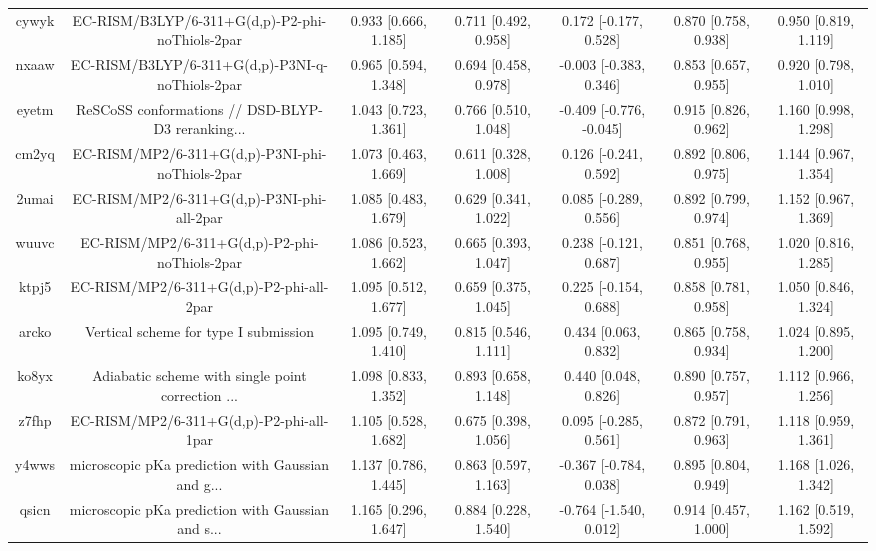 \documentclass{article}
\begin{document}
\begin{center}
\begin{longtable}{|ccccccc|}
 cywyk &    EC-RISM/B3LYP/6-311+G(d,p)-P2-phi-noThiols-2par &  0.933 [0.666, 1.185] &  0.711 [0.492, 0.958] &    0.172 [-0.177, 0.528] &  0.870 [0.758, 0.938] &   0.950 [0.819, 1.119] \\
 nxaaw &    EC-RISM/B3LYP/6-311+G(d,p)-P3NI-q-noThiols-2par &  0.965 [0.594, 1.348] &  0.694 [0.458, 0.978] &   -0.003 [-0.383, 0.346] &  0.853 [0.657, 0.955] &   0.920 [0.798, 1.010] \\
 eyetm &  ReSCoSS conformations // DSD-BLYP-D3 reranking... &  1.043 [0.723, 1.361] &  0.766 [0.510, 1.048] &  -0.409 [-0.776, -0.045] &  0.915 [0.826, 0.962] &   1.160 [0.998, 1.298] \\
 cm2yq &    EC-RISM/MP2/6-311+G(d,p)-P3NI-phi-noThiols-2par &  1.073 [0.463, 1.669] &  0.611 [0.328, 1.008] &    0.126 [-0.241, 0.592] &  0.892 [0.806, 0.975] &   1.144 [0.967, 1.354] \\
 2umai &         EC-RISM/MP2/6-311+G(d,p)-P3NI-phi-all-2par &  1.085 [0.483, 1.679] &  0.629 [0.341, 1.022] &    0.085 [-0.289, 0.556] &  0.892 [0.799, 0.974] &   1.152 [0.967, 1.369] \\
 wuuvc &      EC-RISM/MP2/6-311+G(d,p)-P2-phi-noThiols-2par &  1.086 [0.523, 1.662] &  0.665 [0.393, 1.047] &    0.238 [-0.121, 0.687] &  0.851 [0.768, 0.955] &   1.020 [0.816, 1.285] \\
 ktpj5 &           EC-RISM/MP2/6-311+G(d,p)-P2-phi-all-2par &  1.095 [0.512, 1.677] &  0.659 [0.375, 1.045] &    0.225 [-0.154, 0.688] &  0.858 [0.781, 0.958] &   1.050 [0.846, 1.324] \\
 arcko &              Vertical scheme for type I submission &  1.095 [0.749, 1.410] &  0.815 [0.546, 1.111] &     0.434 [0.063, 0.832] &  0.865 [0.758, 0.934] &   1.024 [0.895, 1.200] \\
 ko8yx &  Adiabatic scheme with single point correction ... &  1.098 [0.833, 1.352] &  0.893 [0.658, 1.148] &     0.440 [0.048, 0.826] &  0.890 [0.757, 0.957] &   1.112 [0.966, 1.256] \\
 z7fhp &           EC-RISM/MP2/6-311+G(d,p)-P2-phi-all-1par &  1.105 [0.528, 1.682] &  0.675 [0.398, 1.056] &    0.095 [-0.285, 0.561] &  0.872 [0.791, 0.963] &   1.118 [0.959, 1.361] \\
 y4wws &  microscopic pKa prediction with Gaussian and g... &  1.137 [0.786, 1.445] &  0.863 [0.597, 1.163] &   -0.367 [-0.784, 0.038] &  0.895 [0.804, 0.949] &   1.168 [1.026, 1.342] \\
 qsicn &  microscopic pKa prediction with Gaussian and s... &  1.165 [0.296, 1.647] &  0.884 [0.228, 1.540] &   -0.764 [-1.540, 0.012] &  0.914 [0.457, 1.000] &   1.162 [0.519, 1.592] \\

\end{longtable}
\end{center}
\end{document}
